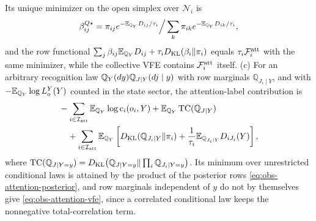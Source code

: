 Its unique minimizer on the open simplex over \(\mathcal N_i\) is
\begin{equation}
\beta^{Q\star}_{ij}
=\pi_{ij}e^{-\mathbb E_{\mathbb Q_Y}D_{ij}/\tau_i}\Big/\sum_k\pi_{ik}e^{-\mathbb E_{\mathbb Q_Y}D_{ik}/\tau_i},
\label{eq:obs-attention-recognition-optimum}
\end{equation}
and the row functional
\(\sum_j\beta_{ij}\mathbb E_{\mathbb Q_Y}D_{ij}+\tau_iD_{\mathrm{KL}}(\beta_i\Vert\pi_i)\) equals
\(\tau_i\mathcal F_i^{\rm att}\) with the same minimizer, while the collective VFE
contains \(\mathcal F_i^{\rm att}\) itself. (c) For an arbitrary recognition law
\(\mathbb Q_Y(dy)\mathbb Q_{J\mid Y}(dj\mid y)\) with row marginals
\(\mathbb Q_{J_i\mid Y}\), and with \(-\mathbb E_{\mathbb Q_Y}\log L_o^Y(Y)\) counted
in the state sector, the attention-label contribution is
\begin{equation}
\begin{split}
&-\sum_{i\in\mathcal I_{\rm att}}\mathbb E_{\mathbb Q_Y}\log\mathrm c_i(o_i,Y)
+\mathbb E_{\mathbb Q_Y}\operatorname{TC}(\mathbb Q_{J\mid Y})\\
&\quad+\sum_{i\in\mathcal I_{\rm att}}\mathbb E_{\mathbb Q_Y}\left[
D_{\mathrm{KL}}(\mathbb Q_{J_i\mid Y}\Vert\pi_i)
+\frac{1}{\tau_i}
\mathbb E_{\mathbb Q_{J_i\mid Y}}D_{iJ_i}(Y)
\right],
\end{split}
\label{eq:obs-attention-correlated-ledger}
\end{equation}
where
\(\operatorname{TC}(\mathbb Q_{J\mid Y=y})=
D_{\mathrm{KL}}\bigl(\mathbb Q_{J\mid Y=y}\Vert\prod_i\mathbb Q_{J_i\mid Y=y}\bigr)\). Its
minimum over unrestricted conditional laws is attained by the product of the
posterior rows \eqref{eq:obs-attention-posterior}, and row marginals
independent of \(y\) do not by themselves give \eqref{eq:obs-attention-vfe},
since a correlated conditional law keeps the nonnegative total-correlation
term.

